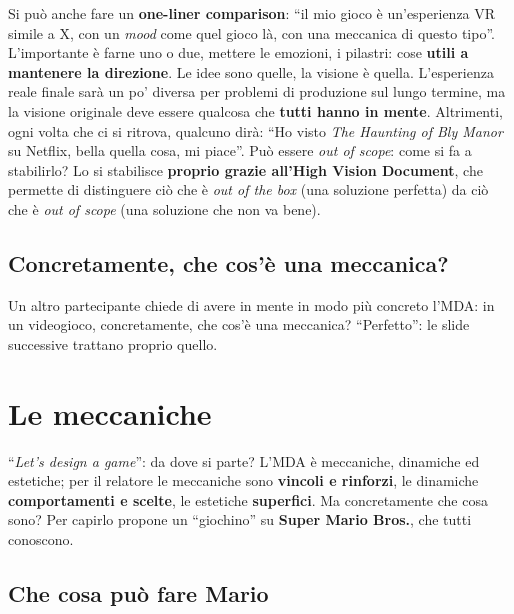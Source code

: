 Si può anche fare un \textbf{one-liner comparison}: ``il mio gioco è
un'esperienza VR simile a X, con un \emph{mood} come quel gioco là, con una
meccanica di questo tipo''. L'importante è farne uno o due, mettere le emozioni,
i pilastri: cose \textbf{utili a mantenere la direzione}. Le idee sono quelle, la
visione è quella. L'esperienza reale finale sarà un po' diversa per problemi di
produzione sul lungo termine, ma la visione originale deve essere qualcosa che
\textbf{tutti hanno in mente}. Altrimenti, ogni volta che ci si ritrova, qualcuno
dirà: ``Ho visto \emph{The Haunting of Bly Manor} su Netflix, bella quella cosa,
mi piace''. Può essere \emph{out of scope}: come si fa a stabilirlo? Lo si
stabilisce \textbf{proprio grazie all'High Vision Document}, che permette di
distinguere ciò che è \emph{out of the box} (una soluzione perfetta) da ciò che è
\emph{out of scope} (una soluzione che non va bene).

\subsection{Concretamente, che cos'è una meccanica?}

Un altro partecipante chiede di avere in mente in modo più concreto l'MDA: in un
videogioco, concretamente, che cos'è una meccanica? ``Perfetto'': le slide
successive trattano proprio quello.

\section{Le meccaniche}
\label{sec:z6-meccaniche}

``\emph{Let's design a game}'': da dove si parte? L'MDA è meccaniche,
dinamiche ed estetiche; per il relatore le meccaniche sono \textbf{vincoli e
rinforzi}, le dinamiche \textbf{comportamenti e scelte}, le estetiche
\textbf{superfici}. Ma concretamente che cosa sono? Per capirlo propone un
``giochino'' su \textbf{Super Mario Bros.}, che tutti conoscono.

\subsection{Che cosa può fare Mario}

